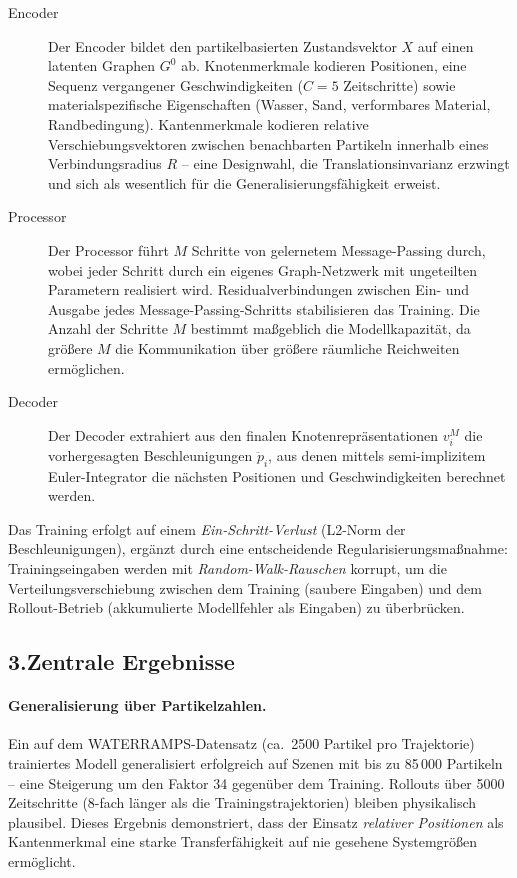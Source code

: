 \documentclass[a4paper,12pt]{article}
\begin{document}
\begin{description}
  \item[Encoder] Der Encoder bildet den partikelbasierten Zustandsvektor $X$ auf
    einen latenten Graphen $G^0$ ab. Knotenmerkmale kodieren Positionen, eine
    Sequenz vergangener Geschwindigkeiten ($C = 5$ Zeitschritte) sowie
    materialspezifische Eigenschaften (Wasser, Sand, verformbares Material,
    Randbedingung). Kantenmerkmale kodieren relative Verschiebungsvektoren zwischen
    benachbarten Partikeln innerhalb eines Verbindungsradius $R$ -- eine Designwahl,
    die Translationsinvarianz erzwingt und sich als wesentlich für die
    Generalisierungsfähigkeit erweist.

  \item[Processor] Der Processor führt $M$ Schritte von gelernetem Message-Passing
    durch, wobei jeder Schritt durch ein eigenes Graph-Netzwerk mit ungeteilten
    Parametern realisiert wird. Residualverbindungen zwischen Ein- und Ausgabe jedes
    Message-Passing-Schritts stabilisieren das Training. Die Anzahl der Schritte $M$
    bestimmt maßgeblich die Modellkapazität, da größere $M$ die Kommunikation über
    größere räumliche Reichweiten ermöglichen.

  \item[Decoder] Der Decoder extrahiert aus den finalen Knotenrepräsentationen
    $v_i^M$ die vorhergesagten Beschleunigungen $\ddot{p}_i$, aus denen mittels
    semi-implizitem Euler-Integrator die nächsten Positionen und Geschwindigkeiten
    berechnet werden.
\end{description}

Das Training erfolgt auf einem \emph{Ein-Schritt-Verlust} (L2-Norm der
Beschleunigungen), ergänzt durch eine entscheidende Regularisierungsmaßnahme:
Trainingseingaben werden mit \emph{Random-Walk-Rauschen} korrupt, um die
Verteilungsverschiebung zwischen dem Training (saubere Eingaben) und dem
Rollout-Betrieb (akkumulierte Modellfehler als Eingaben) zu überbrücken.

\subsection*{3.\quad Zentrale Ergebnisse}

\paragraph{Generalisierung über Partikelzahlen.}
Ein auf dem WATERRAMPS-Datensatz (ca.\ 2500 Partikel pro Trajektorie) trainiertes
Modell generalisiert erfolgreich auf Szenen mit bis zu 85\,000 Partikeln -- eine
Steigerung um den Faktor 34 gegenüber dem Training. Rollouts über 5000 Zeitschritte
(8-fach länger als die Trainingstrajektorien) bleiben physikalisch plausibel. Dieses
Ergebnis demonstriert, dass der Einsatz \emph{relativer Positionen} als
Kantenmerkmal eine starke Transferfähigkeit auf nie gesehene Systemgrößen ermöglicht.
\end{document}
